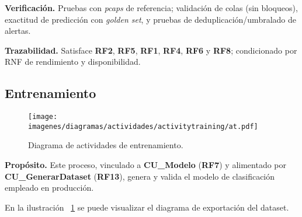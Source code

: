 \textbf{Verificación.} Pruebas con \emph{pcaps} de referencia; validación de colas (sin bloqueos), exactitud de predicción con \emph{golden set}, y pruebas de deduplicación/umbralado de alertas.

\textbf{Trazabilidad.} Satisface \textbf{RF2}, \textbf{RF5}, \textbf{RF1}, \textbf{RF4}, \textbf{RF6} y \textbf{RF8}; condicionado por RNF de rendimiento y disponibilidad.

\subsection{Entrenamiento}


\begin{figure}[H] \centering \texttt{[image: imagenes/diagramas/actividades/activitytraining/at.pdf]} \caption{Diagrama de actividades de entrenamiento.} \label{fig:diagActE} \end{figure}

\textbf{Propósito.} Este proceso, vinculado a \textbf{CU\_Modelo} (\textbf{RF7}) y alimentado por \textbf{CU\_GenerarDataset} (\textbf{RF13}), genera y valida el modelo de clasificación empleado en producción.

En la ilustración ~\ref{fig:diagActE} se puede visualizar el diagrama de exportación del dataset.

